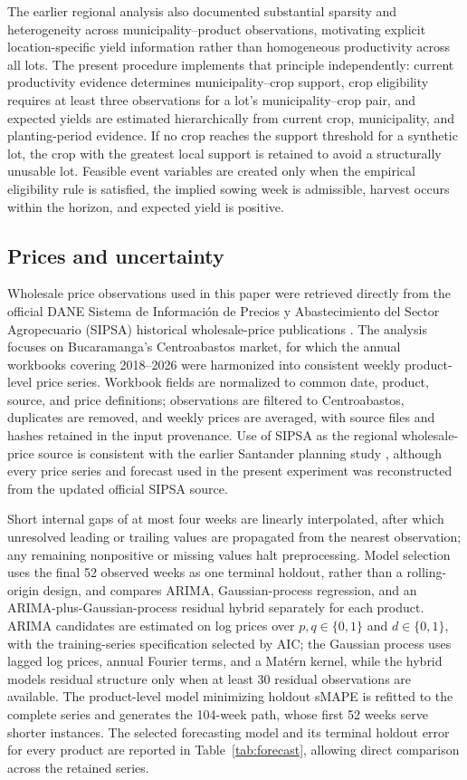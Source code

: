 \documentclass[]{interact}
\begin{document}
The earlier regional analysis also documented substantial sparsity and heterogeneity across municipality--product observations, motivating explicit location-specific yield information rather than homogeneous productivity across all lots. The present procedure implements that principle independently: current productivity evidence determines municipality--crop support, crop eligibility requires at least three observations for a lot's municipality--crop pair, and expected yields are estimated hierarchically from current crop, municipality, and planting-period evidence. If no crop reaches the support threshold for a synthetic lot, the crop with the greatest local support is retained to avoid a structurally unusable lot. Feasible event variables are created only when the empirical eligibility rule is satisfied, the implied sowing week is admissible, harvest occurs within the horizon, and expected yield is positive.

\subsection{Prices and uncertainty}

Wholesale price observations used in this paper were retrieved directly from the official DANE Sistema de Informaci\'on de Precios y Abastecimiento del Sector Agropecuario (SIPSA) historical wholesale-price publications \citep{DANESIPSA}. The analysis focuses on Bucaramanga's Centroabastos market, for which the annual workbooks covering 2018--2026 were harmonized into consistent weekly product-level price series. Workbook fields are normalized to common date, product, source, and price definitions; observations are filtered to Centroabastos, duplicates are removed, and weekly prices are averaged, with source files and hashes retained in the input provenance. Use of SIPSA as the regional wholesale-price source is consistent with the earlier Santander planning study \citep{Talero2018}, although every price series and forecast used in the present experiment was reconstructed from the updated official SIPSA source.

Short internal gaps of at most four weeks are linearly interpolated, after which unresolved leading or trailing values are propagated from the nearest observation; any remaining nonpositive or missing values halt preprocessing. Model selection uses the final 52 observed weeks as one terminal holdout, rather than a rolling-origin design, and compares ARIMA, Gaussian-process regression, and an ARIMA-plus-Gaussian-process residual hybrid separately for each product. ARIMA candidates are estimated on log prices over $p,q\in\{0,1\}$ and $d\in\{0,1\}$, with the training-series specification selected by AIC; the Gaussian process uses lagged log prices, annual Fourier terms, and a Mat\'ern kernel, while the hybrid models residual structure only when at least 30 residual observations are available. The product-level model minimizing holdout sMAPE is refitted to the complete series and generates the 104-week path, whose first 52 weeks serve shorter instances. The selected forecasting model and its terminal holdout error for every product are reported in Table~\ref{tab:forecast}, allowing direct comparison across the retained series.
\end{document}
